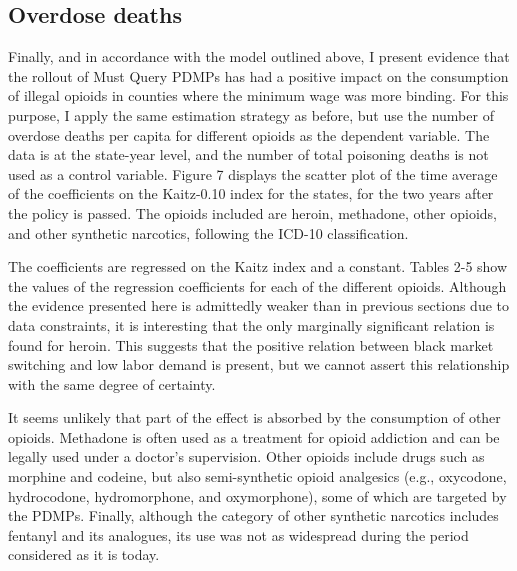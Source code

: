 \documentclass[12pt,a4paper]{article}
\begin{document}
\begin{comment}
    After six months:
    1.01   1.48   0.543
    -0.0981 0.199 -0.396

    After two years:
    2.77   3.68   1.87
    -0.0720 0.265 -0.409 
\end{comment}

\subsection*{Overdose deaths}

Finally, and in accordance with the model outlined above, I present evidence that the rollout of Must Query PDMPs has had a positive impact on the consumption of illegal opioids in counties where the minimum wage was more binding.
For this purpose, I apply the same estimation strategy as before, but use the number of overdose deaths per capita for different opioids as the dependent variable. 
The data is at the state-year level, and the number of total poisoning deaths is not used as a control variable.
Figure 7 displays the scatter plot of the time average of the coefficients on the Kaitz-0.10 index for the states, for the two years after the policy is passed.
The opioids included are heroin, methadone, other opioids, and other synthetic narcotics, following the ICD-10 classification.

The coefficients are regressed on the Kaitz index and a constant. 
Tables 2-5 show the values of the regression coefficients for each of the different opioids.
Although the evidence presented here is admittedly weaker than in previous sections due to data constraints, it is interesting that the only marginally significant relation is found for heroin.
This suggests that the positive relation between black market switching and low labor demand is present, but we cannot assert this relationship with the same degree of certainty. 

It seems unlikely that part of the effect is absorbed by the consumption of other opioids.
Methadone is often used as a treatment for opioid addiction and can be legally used under a doctor's supervision.
Other opioids include drugs such as morphine and codeine, but also semi-synthetic opioid analgesics (e.g., oxycodone, hydrocodone, hydromorphone, and oxymorphone), some of which are targeted by the PDMPs.
Finally, although the category of other synthetic narcotics includes fentanyl and its analogues, its use was not as widespread during the period considered as it is today.
\end{document}
